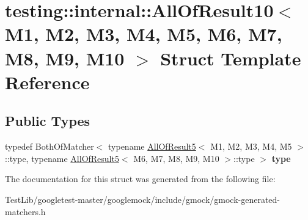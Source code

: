 \hypertarget{structtesting_1_1internal_1_1AllOfResult10}{}\section{testing\+:\+:internal\+:\+:All\+Of\+Result10$<$ M1, M2, M3, M4, M5, M6, M7, M8, M9, M10 $>$ Struct Template Reference}
\label{structtesting_1_1internal_1_1AllOfResult10}
\subsection*{Public Types}
\begin{DoxyCompactItemize}
\item 
\mbox{\label{structtesting_1_1internal_1_1AllOfResult10_a48d6c6de6d0d5445b212119e1f536af5}} 
typedef Both\+Of\+Matcher$<$ typename \hyperlink{structtesting_1_1internal_1_1AllOfResult5}{All\+Of\+Result5}$<$ M1, M2, M3, M4, M5 $>$\+::type, typename \hyperlink{structtesting_1_1internal_1_1AllOfResult5}{All\+Of\+Result5}$<$ M6, M7, M8, M9, M10 $>$\+::type $>$ {\bfseries type}
\end{DoxyCompactItemize}


The documentation for this struct was generated from the following file\+:\begin{DoxyCompactItemize}
\item 
Test\+Lib/googletest-\/master/googlemock/include/gmock/gmock-\/generated-\/matchers.\+h\end{DoxyCompactItemize}
